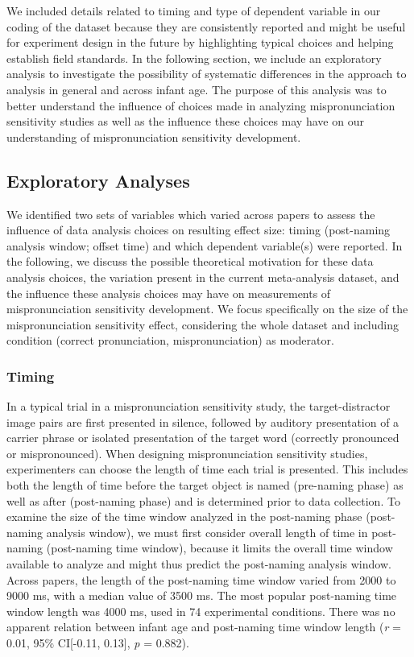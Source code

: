 \documentclass[man]{apa6}
\theoremstyle{definition}
\theoremstyle{definition}
\theoremstyle{definition}
\theoremstyle{remark}
\begin{document}
We included details related to timing and type of dependent variable in
our coding of the dataset because they are consistently reported and
might be useful for experiment design in the future by highlighting
typical choices and helping establish field standards. In the following
section, we include an exploratory analysis to investigate the
possibility of systematic differences in the approach to analysis in
general and across infant age. The purpose of this analysis was to
better understand the influence of choices made in analyzing
mispronunciation sensitivity studies as well as the influence these
choices may have on our understanding of mispronunciation sensitivity
development.

\subsection{Exploratory Analyses}\label{exploratory-analyses}

We identified two sets of variables which varied across papers to assess
the influence of data analysis choices on resulting effect size: timing
(post-naming analysis window; offset time) and which dependent
variable(s) were reported. In the following, we discuss the possible
theoretical motivation for these data analysis choices, the variation
present in the current meta-analysis dataset, and the influence these
analysis choices may have on measurements of mispronunciation
sensitivity development. We focus specifically on the size of the
mispronunciation sensitivity effect, considering the whole dataset and
including condition (correct pronunciation, mispronunciation) as
moderator.

\subsubsection{Timing}\label{timing}

In a typical trial in a mispronunciation sensitivity study, the
target-distractor image pairs are first presented in silence, followed
by auditory presentation of a carrier phrase or isolated presentation of
the target word (correctly pronounced or mispronounced). When designing
mispronunciation sensitivity studies, experimenters can choose the
length of time each trial is presented. This includes both the length of
time before the target object is named (pre-naming phase) as well as
after (post-naming phase) and is determined prior to data collection. To
examine the size of the time window analyzed in the post-naming phase
(post-naming analysis window), we must first consider overall length of
time in post-naming (post-naming time window), because it limits the
overall time window available to analyze and might thus predict the
post-naming analysis window. Across papers, the length of the
post-naming time window varied from 2000 to 9000 ms, with a median value
of 3500 ms. The most popular post-naming time window length was 4000 ms,
used in 74 experimental conditions. There was no apparent relation
between infant age and post-naming time window length (\emph{r} = 0.01,
95\% CI{[}-0.11, 0.13{]}, \emph{p} = 0.882).
\end{document}
